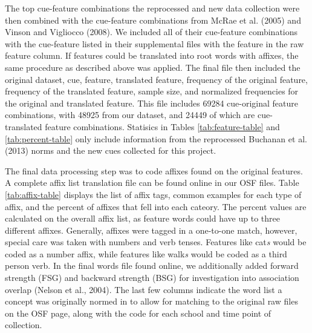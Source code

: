 \documentclass[english,man]{apa6}
\theoremstyle{definition}
\theoremstyle{definition}
\theoremstyle{definition}
\theoremstyle{remark}
\begin{document}
The top cue-feature combinations the reprocessed and new data collection
were then combined with the cue-feature combinations from McRae et al.
(2005) and Vinson and Vigliocco (2008). We included all of their
cue-feature combinations with the cue-feature listed in their
supplemental files with the feature in the raw feature column. If
features could be translated into root words with affixes, the same
procedure as described above was applied. The final file then included
the original dataset, cue, feature, translated feature, frequency of the
original feature, frequency of the translated feature, sample size, and
normalized frequencies for the original and translated feature. This
file includes 69284 cue-original feature combinations, with 48925 from
our dataset, and 24449 of which are cue-translated feature combinations.
Statisics in Tables \ref{tab:feature-table} and \ref{tab:percent-table}
only include information from the reprocessed Buchanan et al. (2013)
norms and the new cues collected for this project.

The final data processing step was to code affixes found on the original
features. A complete affix list translation file can be found online in
our OSF files. Table \ref{tab:affix-table} displays the list of affix
tags, common examples for each type of affix, and the percent of affixes
that fell into each cateory. The percent values are calculated on the
overall affix list, as feature words could have up to three different
affixes. Generally, affixes were tagged in a one-to-one match, however,
special care was taken with numbers and verb tenses. Features like
cat\emph{s} would be coded as a number affix, while features like
walk\emph{s} would be coded as a third person verb. In the final words
file found online, we additionally added forward strength (FSG) and
backward strength (BSG) for investigation into association overlap
(Nelson et al., 2004). The last few columns indicate the word list a
concept was originally normed in to allow for matching to the original
raw files on the OSF page, along with the code for each school and time
point of collection.
\end{document}
